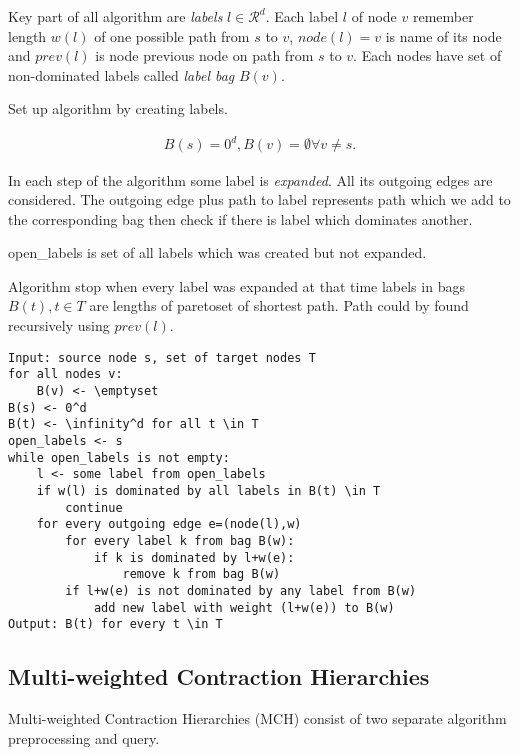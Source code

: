 Key part of all algorithm are \emph{labels} $l\in \mathcal{R}^d$.
Each label $l$ of node $v$ remember length $w(l)$  of one 
possible path from $s$ to $v$, $node(l) = v$ is name of its node
and $prev(l)$ is node previous node on path from $s$ to $v$.
Each nodes have set of non-dominated labels called \emph{label bag} $B(v)$.

Set up algorithm by creating labels.

\begin{gather*} 
B(s)=0^d, B(v)=\emptyset \forall v \ne s.
\end{gather*} 

In each step of the algorithm some label is \emph{expanded}. 
All its outgoing edges are considered. 
The outgoing edge plus path to label represents 
path which we add to the corresponding bag then check if there
is label which dominates another.

open\_labels is set of all labels which was created but not expanded.

Algorithm stop when every label was expanded at that time
labels in bags $B(t), t \in T$ are lengths of paretoset of shortest path.
Path could by found recursively using $prev(l)$.


\begin{lstlisting}[caption={Meta Search Algorithm},label=list:8-6,captionpos=t,float,abovecaptionskip=-\medskipamount]
Input: source node s, set of target nodes T
for all nodes v:
	B(v) <- \emptyset
B(s) <- 0^d
B(t) <- \infinity^d for all t \in T
open_labels <- s
while open_labels is not empty:
	l <- some label from open_labels
    if w(l) is dominated by all labels in B(t) \in T
    	continue
    for every outgoing edge e=(node(l),w)
    	for every label k from bag B(w):
        	if k is dominated by l+w(e):
            	remove k from bag B(w)
        if l+w(e) is not dominated by any label from B(w)
        	add new label with weight (l+w(e)) to B(w)
Output: B(t) for every t \in T
\end{lstlisting}



\subsection{Multi-weighted Contraction Hierarchies}
Multi-weighted Contraction Hierarchies (MCH) consist of two separate algorithm
preprocessing and query.

